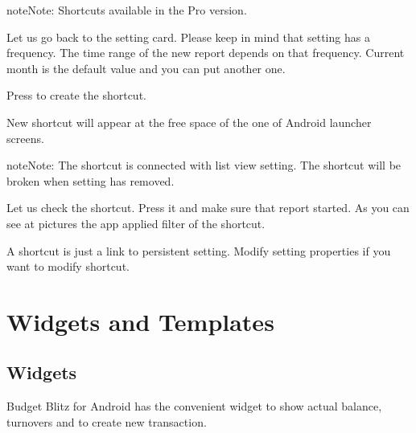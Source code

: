 \documentclass[a4paper,10pt,english]{sphinxmanual}
\begin{document}
\begin{sphinxadmonition}{note}{Note:}
\sphinxAtStartPar
Shortcuts available in the Pro version.
\end{sphinxadmonition}

\sphinxAtStartPar
Let us go back to the setting card. Please keep in mind that setting has a frequency. The time range of the
new report depends on that frequency. Current month is the default value and you can put another one.

\sphinxAtStartPar
Press  to create the shortcut.

\noindent{}

\noindent{}

\sphinxAtStartPar
New shortcut will appear at the free space of the one of Android launcher screens.

\begin{sphinxadmonition}{note}{Note:}
\sphinxAtStartPar
The shortcut is connected with list view setting. The shortcut will be broken when setting has removed.
\end{sphinxadmonition}

\noindent{}

\noindent{}

\noindent{}

\sphinxAtStartPar
Let us check the shortcut. Press it and make sure that report started. As you can see at pictures the app
applied filter of the shortcut.

\sphinxAtStartPar
A shortcut is just a link to persistent setting. Modify setting properties if you want to modify shortcut.

\sphinxstepscope


\chapter{Widgets and Templates}
\label{\detokenize{widgets:widgets-and-templates}}\label{\detokenize{widgets:chapter-widgets}}\label{\detokenize{widgets::doc}}

\section{Widgets}
\label{\detokenize{widgets:widgets}}
\sphinxAtStartPar
Budget Blitz for Android has the convenient widget to show actual balance, turnovers and to create new transaction.
\end{document}
